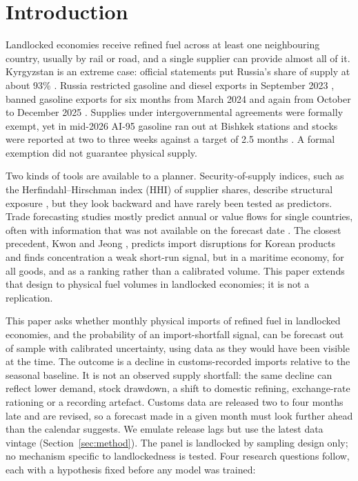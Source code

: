 \documentclass[conference]{IEEEtran}
\begin{document}
\section{Introduction}

Landlocked economies receive refined fuel across at least one neighbouring country, usually by rail or road, and a single supplier can provide almost all of it. Kyrgyzstan is an extreme case: official statements put Russia's share of supply at about 93\% \cite{economist_stocks,kg24_exempt}. Russia restricted gasoline and diesel exports in September 2023 \cite{gta2023}, banned gasoline exports for six months from March 2024 \cite{enerdata2024} and again from October to December 2025 \cite{gta2025}. Supplies under intergovernmental agreements were formally exempt, yet in mid-2026 AI-95 gasoline ran out at Bishkek stations and stocks were reported at two to three weeks against a target of 2.5 months \cite{kwan2026,kunuz2026,economist_stocks}. A formal exemption did not guarantee physical supply.

Two kinds of tools are available to a planner. Security-of-supply indices, such as the Herfindahl--Hirschman index (HHI) of supplier shares, describe structural exposure \cite{cohen2011,lecoq2009,ang2015}, but they look backward and have rarely been tested as predictors. Trade forecasting studies mostly predict annual or value flows for single countries, often with information that was not available on the forecast date \cite{santi2023,pradhan2023,khajoui2024}. The closest precedent, Kwon and Jeong \cite{kwon2026}, predicts import disruptions for Korean products and finds concentration a weak short-run signal, but in a maritime economy, for all goods, and as a ranking rather than a calibrated volume. This paper extends that design to physical fuel volumes in landlocked economies; it is not a replication.

This paper asks whether monthly physical imports of refined fuel in landlocked economies, and the probability of an import-shortfall signal, can be forecast out of sample with calibrated uncertainty, using data as they would have been visible at the time. The outcome is a decline in customs-recorded imports relative to the seasonal baseline. It is not an observed supply shortfall: the same decline can reflect lower demand, stock drawdown, a shift to domestic refining, exchange-rate rationing or a recording artefact. Customs data are released two to four months late and are revised, so a forecast made in a given month must look further ahead than the calendar suggests. We emulate release lags but use the latest data vintage (Section~\ref{sec:method}). The panel is landlocked by sampling design only; no mechanism specific to landlockedness is tested. Four research questions follow, each with a hypothesis fixed before any model was trained:
\end{document}
